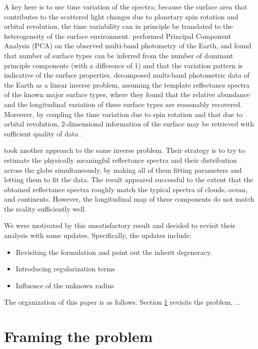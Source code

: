 \documentclass[iop,numberedappendix,apj,]{emulateapj}
\begin{document}
A key here is to use time variation of the spectra; because the surface area that contributes to the scattered light changes due to planetary spin rotation and orbital revolution, the time variability can in principle be translated to the heterogeneity of the surface environment.  
\citet{Cowan2009, Cowan2011} performed Principal Component Analysis (PCA) on the observed multi-band photometry of the Earth, and found that number of surface types can be inferred from the number of dominant principle components (with a difference of 1) and that the variation pattern is indicative of the surface properties. 
\citet{Fujii2010, Fujii2011} decomposed multi-band photometric data of the Earth as a linear inverse problem, assuming the template reflectance spectra of the known major surface types, where they found that the relative abundance and the longitudinal variation of these surface types are reasonably recovered. 
Moreover, by coupling the time variation due to spin rotation and that due to orbital revolution, 2-dimensional information of the surface may be retrieved with sufficient quality of data \citep{Kawahara2010, Kawahara2011, Fujii2012}. 

\citet{Cowan2013} took another approach to the same inverse problem. 
Their strategy is to try to estimate the physically meaningful reflectance spectra and their distribution across the globe simultaneously, by making all of them fitting parameters and letting them to fit the data. 
The result appeared successful to the extent that the obtained reflectance spectra roughly match the typical spectra of clouds, ocean, and continents. 
However, the longitudinal map of these components do not match the reality sufficiently well. 

We were motivated by this unsatisfactory result and decided to revisit their analysis with some updates. 
Specifically, the updates include:
\begin{itemize}
\item Revisiting the formulation and point out the inherit degeneracy. 
\item Introducing regularization terms
\item Influence of the unknown radius
\end{itemize}

The organization of this paper is as follows. 
Section \ref{s:frame} revisits the problem, ...

\section{Framing the problem}
\label{s:frame}
\end{document}
